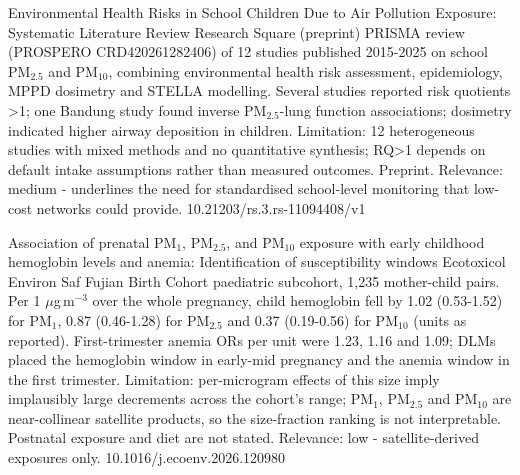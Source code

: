 \documentclass[10pt]{article}
\begin{document}
{Environmental Health Risks in School Children Due to Air Pollution Exposure: Systematic Literature Review}
{Research Square (preprint)}
{PRISMA review (PROSPERO CRD420261282406) of 12 studies published 2015-2025 on school PM$_{2.5}$ and PM$_{10}$, combining environmental health risk assessment, epidemiology, MPPD dosimetry and STELLA modelling. Several studies reported risk quotients >1; one Bandung study found inverse PM$_{2.5}$-lung function associations; dosimetry indicated higher airway deposition in children. Limitation: 12 heterogeneous studies with mixed methods and no quantitative synthesis; RQ>1 depends on default intake assumptions rather than measured outcomes. Preprint. Relevance: medium - underlines the need for standardised school-level monitoring that low-cost networks could provide.}
{10.21203/rs.3.rs-11094408/v1}

\par{}\baselineskip{}\baselineskip
{}

{Association of prenatal PM$_{1}$, PM$_{2.5}$, and PM$_{10}$ exposure with early childhood hemoglobin levels and anemia: Identification of susceptibility windows}
{Ecotoxicol Environ Saf}
{Fujian Birth Cohort paediatric subcohort, 1,235 mother-child pairs. Per 1 $\mu$g\,m$^{-3}$ over the whole pregnancy, child hemoglobin fell by 1.02 (0.53-1.52) for PM$_{1}$, 0.87 (0.46-1.28) for PM$_{2.5}$ and 0.37 (0.19-0.56) for PM$_{10}$ (units as reported). First-trimester anemia ORs per unit were 1.23, 1.16 and 1.09; DLMs placed the hemoglobin window in early-mid pregnancy and the anemia window in the first trimester. Limitation: per-microgram effects of this size imply implausibly large decrements across the cohort's range; PM$_{1}$, PM$_{2.5}$ and PM$_{10}$ are near-collinear satellite products, so the size-fraction ranking is not interpretable. Postnatal exposure and diet are not stated. Relevance: low - satellite-derived exposures only.}
{10.1016/j.ecoenv.2026.120980}
\end{document}
